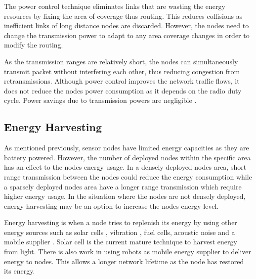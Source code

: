 The power control technique eliminates links that are wasting the energy resources by fixing the area of coverage thus routing. This reduces collisions as inefficient links of long distance nodes are discarded. However, the nodes need to change the transmission power to adapt to any area coverage changes in order to modify the routing. 

As the transmission ranges are relatively short, the nodes can simultaneously transmit packet without interfering each other, thus reducing congestion from retransmissions. Although power control improves the network traffic flows, it does not reduce the nodes power consumption as it depends on the radio duty cycle. Power savings due to transmission powers are negligible \cite{macsurvey}.


\subsection{Energy Harvesting}
As mentioned previously, sensor nodes have limited energy capacities as they are battery powered. However, the number of deployed nodes within the specific area has an effect to the nodes energy usage. In a densely deployed nodes area, short range transmission between the nodes could reduce the energy consumption while a sparsely deployed nodes area have a longer range transmission which require higher energy usage. In the situation where the nodes are not densely deployed, energy harvesting may be an option to increase the nodes energy level.

Energy harvesting is when a node tries to replenish its energy by using other energy sources such as solar cells \cite{wsnheap, reviewharvest}, vibration \cite{gilbert2008comparison}, fuel cells, acoustic noise and a mobile supplier \cite{wsnSurvey1}. Solar cell is the current mature technique to harvest energy from light. There is also work in using robots as mobile energy supplier to deliver energy to nodes. This allows a longer network lifetime as the node has restored its energy. 

